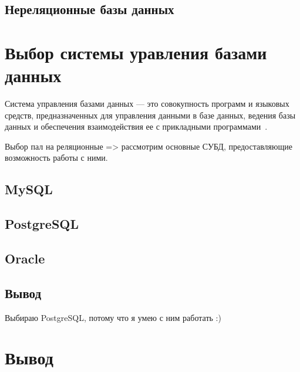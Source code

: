 \subsection{Нереляционные базы данных}

\section{Выбор системы уравления базами данных}

Система управления базами данных --- это совокупность программ и языковых
средств, предназначенных для управления данными в базе данных, ведения базы
данных и обеспечения взаимодействия ее с прикладными программами~\cite{gost01}.

Выбор пал на реляционные => рассмотрим основные СУБД, предоставляющие
возможность работы с ними.

\subsection{MySQL}

\subsection{PostgreSQL}

\subsection{Oracle}

\subsection{Вывод}

Выбираю PostgreSQL, потому что я умею с ним работать :)

\section{Вывод}
